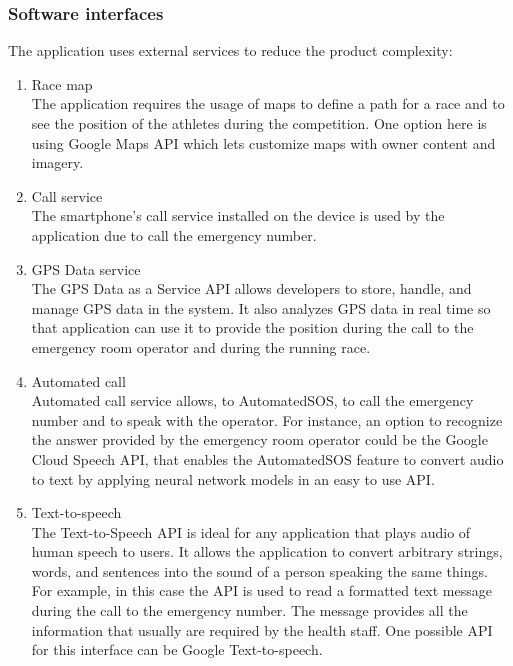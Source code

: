 \subsubsection{Software interfaces}
The application uses external services to reduce the product complexity:
\begin{enumerate}
\item Race map\\
The application requires the usage of maps to define a path for a race and to see the position of the athletes during the competition. One option here is using Google Maps API which lets customize maps with owner content and imagery.
\item Call service\\
The smartphone's call service installed on the device is used by the application due to call the emergency number.
\item GPS Data service\\
The GPS Data as a Service API allows developers to store, handle, and manage GPS data in the system. It also analyzes GPS data in real time so that application can use it to provide the position during the call to the emergency room operator and during the running race.
\item Automated call\\
Automated call service allows, to AutomatedSOS, to call the emergency number and to speak with the operator.
For instance, an option to recognize the answer provided by the emergency room operator could be the Google Cloud Speech API, that enables the AutomatedSOS feature to convert audio to text by applying neural network models in an easy to use API. 
\item Text-to-speech\\
The Text-to-Speech API is ideal for any application that plays audio of human speech to users. It allows the application to convert arbitrary strings, words, and sentences into the sound of a person speaking the same things. For example, in this case the API is used to read a formatted text message during the call to the emergency number. The message provides all the information that usually are required by the health staff. One possible API for this interface can be Google Text-to-speech.
\end{enumerate}


